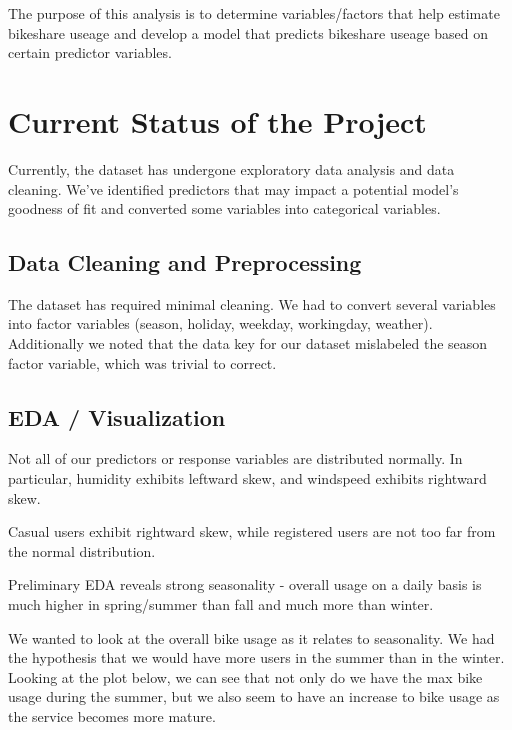 \documentclass[
  11pt,
]{article}
\begin{document}
The purpose of this analysis is to determine variables/factors that help
estimate bikeshare useage and develop a model that predicts bikeshare
useage based on certain predictor variables.

\hypertarget{current-status-of-the-project}{%
\section{Current Status of the
Project}\label{current-status-of-the-project}}

Currently, the dataset has undergone exploratory data analysis and data
cleaning. We've identified predictors that may impact a potential
model's goodness of fit and converted some variables into categorical
variables.

\hypertarget{data-cleaning-and-preprocessing}{%
\subsection{Data Cleaning and
Preprocessing}\label{data-cleaning-and-preprocessing}}

The dataset has required minimal cleaning. We had to convert several
variables into factor variables (season, holiday, weekday, workingday,
weather). Additionally we noted that the data key for our dataset
mislabeled the season factor variable, which was trivial to correct.

\hypertarget{eda-visualization}{%
\subsection{EDA / Visualization}\label{eda-visualization}}

Not all of our predictors or response variables are distributed
normally. In particular, humidity exhibits leftward skew, and windspeed
exhibits rightward skew.

Casual users exhibit rightward skew, while registered users are not too
far from the normal distribution.

Preliminary EDA reveals strong seasonality - overall usage on a daily
basis is much higher in spring/summer than fall and much more than
winter.

We wanted to look at the overall bike usage as it relates to
seasonality. We had the hypothesis that we would have more users in the
summer than in the winter. Looking at the plot below, we can see that
not only do we have the max bike usage during the summer, but we also
seem to have an increase to bike usage as the service becomes more
mature.
\end{document}
